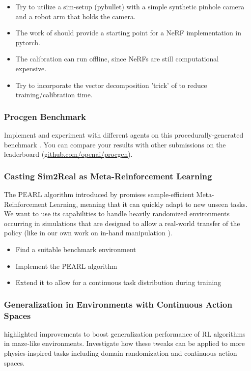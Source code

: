 \documentclass[a4paper]{article}
\begin{document}
\begin{itemize}
  \item Try to utilize a sim-setup (pybullet) with a simple synthetic pinhole camera and a robot arm that holds the camera.
  \item The work of \cite{SCNeRF2021} should provide a starting point for a NeRF implementation in pytorch.
  \item The calibration can run offline, since NeRFs are still computational expensive.
  \item Try to incorporate the vector decomposition 'trick' of \cite{TensoRF} to reduce training/calibration time.
\end{itemize}





\subsubsection{Procgen Benchmark}
Implement and experiment with different agents on this procedurally-generated benchmark \cite{procgen2020}.
You can compare your results with other submissions on the leaderboard (\url{github.com/openai/procgen}).

\subsubsection{Casting Sim2Real as Meta-Reinforcement Learning}
The PEARL algorithm introduced by \cite{rakelly2019} promises sample-efficient Meta-Reinforcement Learning, meaning that it can quickly adapt to new unseen tasks. We want to use its capabilities to handle heavily randomized environments occurring in simulations that are designed to allow a real-world transfer of the policy (like in our own work on in-hand manipulation \cite{sievers2021}).
\begin{itemize}
	\item Find a suitable benchmark environment
	\item Implement the PEARL algorithm
	\item Extend it to allow for a continuous task distribution during training
\end{itemize}



\subsubsection{Generalization in Environments with Continuous Action Spaces}
\cite{igl2019} highlighted improvements to boost generalization performance of RL algorithms in maze-like environments. Investigate how these tweaks can be applied to more physics-inspired tasks including domain randomization and continuous action spaces.




\end{document}
